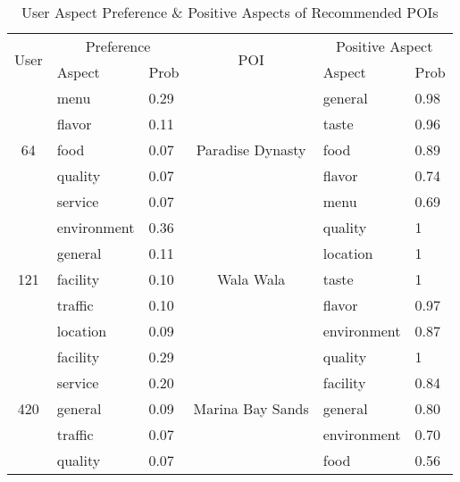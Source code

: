 \begin{table}
\centering
\caption{User Aspect Preference \& Positive Aspects of Recommended POIs}
\begin{tabular}{l|l|l|l|l|l}
\hline
\multirow{2}{*}{User} & \multicolumn{ 2}{c|}{Preference} & \multicolumn{ 1}{|c|}{\multirow{2}{*}{POI}} & \multicolumn{ 2}{c}{Positive Aspect}\\
\cline{2-3}
\cline{5-6}
\multicolumn{ 1}{c|}{} & Aspect & Prob & \multicolumn{ 1}{c|}{} & Aspect & Prob \\
\hline
\multicolumn{ 1}{c|}{\multirow{5}{*}{64}} & menu & 0.29 & \multicolumn{ 1}{c|}{\multirow{5}{*}{Paradise Dynasty}} & general & 0.98\\
\cline{2-3}
\cline{5-6}
\multicolumn{ 1}{c|}{} & flavor & 0.11 & \multicolumn{ 1}{c|}{} & taste & 0.96\\
\cline{2-3}
\cline{5-6}
\multicolumn{ 1}{c|}{} & food & 0.07 & \multicolumn{ 1}{c|}{} & food & 0.89\\
\cline{2-3}
\cline{5-6}
\multicolumn{ 1}{c|}{} & quality & 0.07 & \multicolumn{ 1}{c|}{(Restaurant)} & flavor & 0.74\\
\cline{2-3}
\cline{5-6}
\multicolumn{ 1}{c|}{} & service & 0.07 & \multicolumn{ 1}{c|}{} & menu & 0.69\\
\hline
\multicolumn{ 1}{c|}{\multirow{5}{*}{121}} & environment & 0.36 & \multicolumn{ 1}{c|}{\multirow{5}{*}{Wala Wala}} & quality & 1\\
\cline{2-3}
\cline{5-6}
\multicolumn{ 1}{c|}{} & general & 0.11 & \multicolumn{ 1}{c|}{} & location & 1\\
\cline{2-3}
\cline{5-6}
\multicolumn{ 1}{c|}{} & facility & 0.10 & \multicolumn{ 1}{c|}{} & taste & 1\\
\cline{2-3}
\cline{5-6}
\multicolumn{ 1}{c|}{} & traffic & 0.10 & \multicolumn{ 1}{c|}{Cafe Bar} & flavor & 0.97\\
\cline{2-3}
\cline{5-6}
\multicolumn{ 1}{c|}{} & location & 0.09 & \multicolumn{ 1}{c|}{} & environment & 0.87\\
\hline
\multicolumn{ 1}{c|}{\multirow{5}{*}{420}} & facility & 0.29 & \multicolumn{ 1}{c|}{\multirow{5}{*}{Marina Bay Sands}} & quality & 1\\
\cline{2-3}
\cline{5-6}
\multicolumn{ 1}{c|}{} & service & 0.20 & \multicolumn{ 1}{c|}{} & facility & 0.84\\
\cline{2-3}
\cline{5-6}
\multicolumn{ 1}{c|}{} & general & 0.09 & \multicolumn{ 1}{c|}{} & general & 0.80\\
\cline{2-3}
\cline{5-6}
\multicolumn{ 1}{c|}{} & traffic & 0.07 & \multicolumn{ 1}{c|}{(Hotel)} & environment & 0.70\\
\cline{2-3}
\cline{5-6}
\multicolumn{ 1}{c|}{} & quality & 0.07 & \multicolumn{ 1}{c|}{} & food & 0.56\\
\hline
\end{tabular}
\label{tab:reason}
\end{table}

